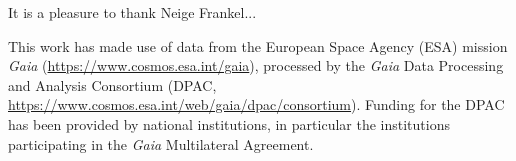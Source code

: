 \begin{acknowledgements}

It is a pleasure to thank Neige Frankel...



This work has made use of data from the European Space Agency (ESA) mission
{\it Gaia} (\url{https://www.cosmos.esa.int/gaia}), processed by the {\it Gaia}
Data Processing and Analysis Consortium (DPAC,
\url{https://www.cosmos.esa.int/web/gaia/dpac/consortium}). Funding for the DPAC
has been provided by national institutions, in particular the institutions
participating in the {\it Gaia} Multilateral Agreement.

\end{acknowledgements}



